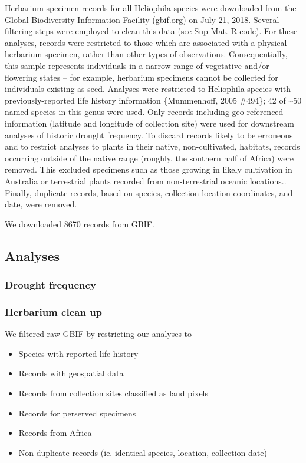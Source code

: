 \documentclass[man,floatsintext]{apa6}
\providecommand{\tightlist}{%
  \setlength{\itemsep}{0pt}\setlength{\parskip}{0pt}}
\theoremstyle{definition}
\theoremstyle{definition}
\theoremstyle{definition}
\theoremstyle{remark}
\begin{document}
Herbarium specimen records for all Heliophila species were downloaded
from the Global Biodiversity Information Facility (gbif.org) on July 21,
2018. Several filtering steps were employed to clean this data (see Sup
Mat. R code). For these analyses, records were restricted to those which
are associated with a physical herbarium specimen, rather than other
types of observations. Consequentially, this sample represents
individuals in a narrow range of vegetative and/or flowering states --
for example, herbarium specimens cannot be collected for individuals
existing as seed. Analyses were restricted to Heliophila species with
previously-reported life history information \{Mummenhoff, 2005 \#494\};
42 of \textasciitilde{}50 named species in this genus were used. Only
records including geo-referenced information (latitude and longitude of
collection site) were used for downstream analyses of historic drought
frequency. To discard records likely to be erroneous and to restrict
analyses to plants in their native, non-cultivated, habitats, records
occurring outside of the native range (roughly, the southern half of
Africa) were removed. This excluded specimens such as those growing in
likely cultivation in Australia or terrestrial plants recorded from
non-terrestrial oceanic locations.. Finally, duplicate records, based on
species, collection location coordinates, and date, were removed.

We downloaded 8670 records from GBIF.

\hypertarget{analyses}{%
\subsection{Analyses}\label{analyses}}

\hypertarget{drought-frequency}{%
\subsubsection{Drought frequency}\label{drought-frequency}}

\hypertarget{herbarium-clean-up}{%
\subsubsection{Herbarium clean up}\label{herbarium-clean-up}}

We filtered raw GBIF by restricting our analyses to

\begin{itemize}
\tightlist
\item
  Species with reported life history\\
\item
  Records with geospatial data\\
\item
  Records from collection sites classified as land pixels
\item
  Records for perserved specimens
\item
  Records from Africa
\item
  Non-duplicate records (ie. identical species, location, collection
  date)
\end{itemize}
\end{document}
